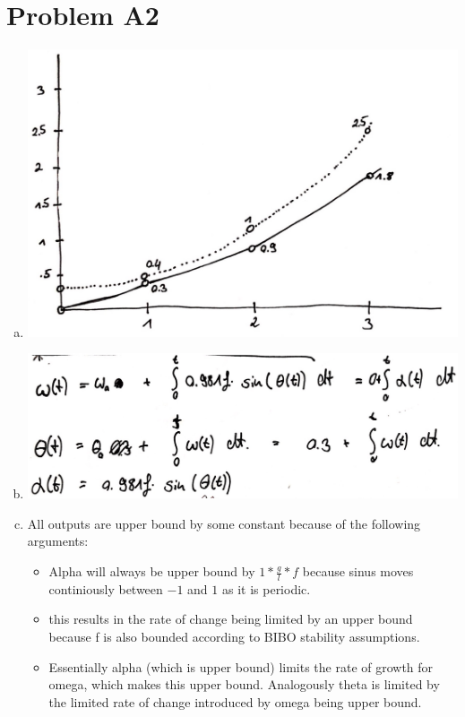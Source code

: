 \documentclass[12pt]{article}
\begin{document}
\section*{Problem A2}
\begin{enumerate}[a)]
  \item
      \includegraphics[scale = 0.22]{pictures/pa2a}\\
  \item
      \includegraphics[scale = 0.22]{pictures/pa2b}\\
  \item All outputs are upper bound by some constant because of the following arguments:
  \begin{itemize}
    \item Alpha will always be upper bound by $1* \frac{g}{l} * f$ because sinus moves continiously between $-1$ and $1$ as it is periodic.
    \item this results in the rate of change being limited by an upper bound because f is also bounded according to BIBO stability assumptions.
    \item Essentially alpha (which is upper bound) limits the rate of growth for omega, which makes this upper bound. Analogously theta is limited by the limited rate of change introduced by omega being upper bound.

  \end{itemize}
\end{enumerate}
\end{document}
